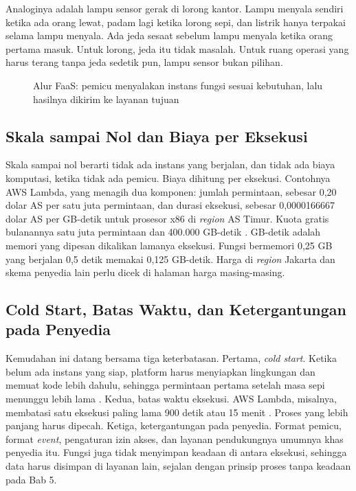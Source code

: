 Analoginya adalah lampu sensor gerak di lorong kantor. Lampu menyala sendiri ketika ada orang
lewat, padam lagi ketika lorong sepi, dan listrik hanya terpakai selama lampu menyala. Ada jeda
sesaat sebelum lampu menyala ketika orang pertama masuk. Untuk lorong, jeda itu tidak masalah.
Untuk ruang operasi yang harus terang tanpa jeda sedetik pun, lampu sensor bukan pilihan.

\begin{figure}[!htb]
  \centering
  
  \caption{Alur FaaS: pemicu menyalakan instans fungsi sesuai kebutuhan, lalu hasilnya dikirim ke
           layanan tujuan}
  \label{fig:ch08-alur-serverless}
\end{figure}

\subsection{Skala sampai Nol dan Biaya per Eksekusi}

Skala sampai nol berarti tidak ada instans yang berjalan, dan tidak ada biaya komputasi, ketika
tidak ada pemicu. Biaya dihitung per eksekusi. Contohnya AWS Lambda, yang menagih dua komponen:
jumlah permintaan, sebesar 0,20 dolar AS per satu juta permintaan, dan durasi eksekusi, sebesar
0,0000166667 dolar AS per GB-detik untuk prosesor x86 di \textit{region} AS Timur. Kuota gratis
bulanannya satu juta permintaan dan 400.000 GB-detik \cite{c08-lambda-pricing}. GB-detik adalah
memori yang dipesan dikalikan lamanya eksekusi. Fungsi bermemori 0,25 GB yang berjalan 0,5 detik
memakai 0,125 GB-detik. Harga di \textit{region} Jakarta dan skema penyedia lain perlu dicek di
halaman harga masing-masing.

\subsection{Cold Start, Batas Waktu, dan Ketergantungan pada Penyedia}

Kemudahan ini datang bersama tiga keterbatasan. Pertama, \textit{cold start}. Ketika belum ada
instans yang siap, platform harus menyiapkan lingkungan dan memuat kode lebih dahulu, sehingga
permintaan pertama setelah masa sepi menunggu lebih lama \cite{c08-jonas2019}. Kedua, batas waktu
eksekusi. AWS Lambda, misalnya, membatasi satu eksekusi paling lama 900 detik atau 15 menit
\cite{c08-lambda-quotas}. Proses yang lebih panjang harus dipecah. Ketiga, ketergantungan pada
penyedia. Format pemicu, format \textit{event}, pengaturan izin akses, dan layanan pendukungnya
umumnya khas penyedia itu. Fungsi juga tidak menyimpan keadaan di antara eksekusi, sehingga data
harus disimpan di layanan lain, sejalan dengan prinsip proses tanpa keadaan pada Bab 5.


